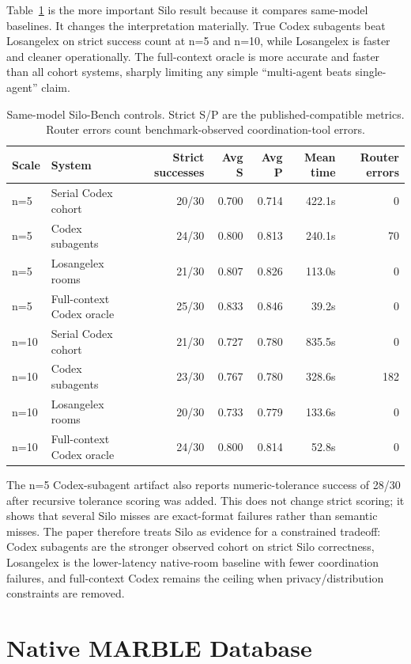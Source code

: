 \documentclass[10pt,twocolumn]{article}
\begin{document}
Table~\ref{tab:silo-controls} is the more important Silo result because it compares same-model baselines. It changes the interpretation materially. True Codex subagents beat Losangelex on strict success count at n=5 and n=10, while Losangelex is faster and cleaner operationally. The full-context oracle is more accurate and faster than all cohort systems, sharply limiting any simple ``multi-agent beats single-agent'' claim.

\begin{table}[t]
\centering
\scriptsize
\caption{Same-model Silo-Bench controls. Strict S/P are the published-compatible metrics. Router errors count benchmark-observed coordination-tool errors.}
\begin{tabularx}{\textwidth}{@{}llrrrrr@{}}
\toprule
Scale & System & Strict successes & Avg S & Avg P & Mean time & Router errors \\
\midrule
n=5 & Serial Codex cohort & 20/30 & 0.700 & 0.714 & 422.1s & 0 \\
n=5 & Codex subagents & 24/30 & 0.800 & 0.813 & 240.1s & 70 \\
n=5 & Losangelex rooms & 21/30 & 0.807 & 0.826 & 113.0s & 0 \\
n=5 & Full-context Codex oracle & 25/30 & 0.833 & 0.846 & 39.2s & 0 \\
\midrule
n=10 & Serial Codex cohort & 21/30 & 0.727 & 0.780 & 835.5s & 0 \\
n=10 & Codex subagents & 23/30 & 0.767 & 0.780 & 328.6s & 182 \\
n=10 & Losangelex rooms & 20/30 & 0.733 & 0.779 & 133.6s & 0 \\
n=10 & Full-context Codex oracle & 24/30 & 0.800 & 0.814 & 52.8s & 0 \\
\bottomrule
\end{tabularx}
\label{tab:silo-controls}
\end{table}

The n=5 Codex-subagent artifact also reports numeric-tolerance success of 28/30 after recursive tolerance scoring was added. This does not change strict scoring; it shows that several Silo misses are exact-format failures rather than semantic misses. The paper therefore treats Silo as evidence for a constrained tradeoff: Codex subagents are the stronger observed cohort on strict Silo correctness, Losangelex is the lower-latency native-room baseline with fewer coordination failures, and full-context Codex remains the ceiling when privacy/distribution constraints are removed.

\section{Native MARBLE Database}
\end{document}
